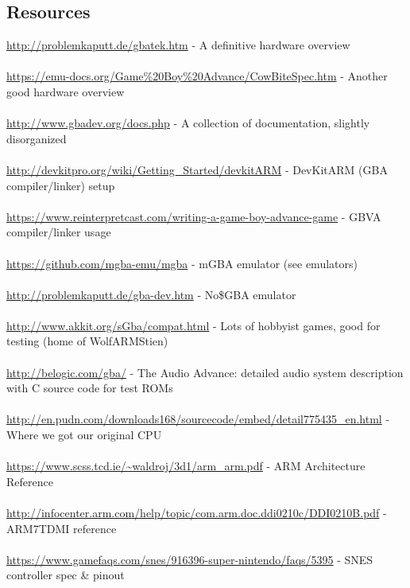 \documentclass[11pt,a4paper]{article}
\begin{document}
	\subsection{Resources}
	\url{http://problemkaputt.de/gbatek.htm} - A definitive hardware overview\\\\
	\url{https://emu-docs.org/Game\%20Boy\%20Advance/CowBiteSpec.htm} - Another good hardware overview\\\\
	\url{http://www.gbadev.org/docs.php} - A collection of documentation, slightly disorganized\\\\
	\url{http://devkitpro.org/wiki/Getting_Started/devkitARM} - DevKitARM (GBA compiler/linker) setup\\\\
	\url{https://www.reinterpretcast.com/writing-a-game-boy-advance-game} - GBVA compiler/linker usage\\\\
	\url{https://github.com/mgba-emu/mgba} - mGBA emulator (see emulators)\\\\
	\url{http://problemkaputt.de/gba-dev.htm} - No\$GBA emulator\\\\
	\url{http://www.akkit.org/sGba/compat.html} - Lots of hobbyist games, good for testing (home of WolfARMStien)\\\\
	\url{http://belogic.com/gba/} - The Audio Advance: detailed audio system description with C source code for test ROMs\\\\
	\url{http://en.pudn.com/downloads168/sourcecode/embed/detail775435_en.html} - Where we got our original CPU\\\\
	\url{https://www.scss.tcd.ie/~waldroj/3d1/arm\_arm.pdf} - ARM Architecture Reference\\\\
	\url{http://infocenter.arm.com/help/topic/com.arm.doc.ddi0210c/DDI0210B.pdf} - ARM7TDMI reference\\\\
	\url{https://www.gamefaqs.com/snes/916396-super-nintendo/faqs/5395} - SNES controller spec \& pinout
	

	
	\printbibliography
	
\end{document}
